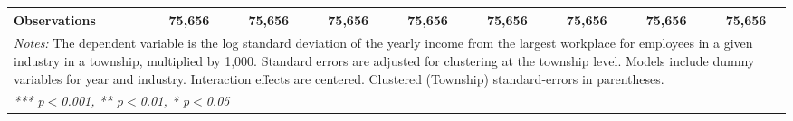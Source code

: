 \begin{tabular}{lcccccccc}
   Observations                                          & 75,656          & 75,656          & 75,656          & 75,656           & 75,656           & 75,656           & 75,656           & 75,656\\  
   \midrule \midrule
\multicolumn{9}{p{24cm}}{\emph{Notes:} The dependent variable is the log 
    standard deviation of the yearly income from the largest workplace for 
    employees in a given industry in a township, multiplied by 1,000. Standard 
    errors are adjusted for clustering at the township level. Models include 
    dummy variables for year and industry. Interaction effects are centered. 
    Clustered (Township) standard-errors in parentheses.}\\
\multicolumn{9}{l}{\emph{*** p$<$0.001, ** p$<$0.01, * p$<$0.05}} \\ 
\end{tabular}
\par\endgroup
